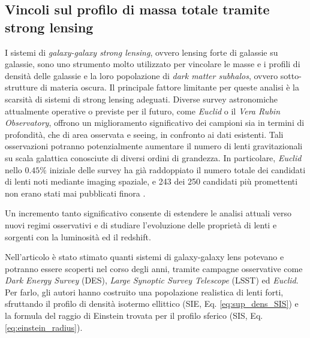 \subsection{Vincoli sul profilo di massa totale tramite strong lensing}
I sistemi di \emph{galaxy-galaxy strong lensing}, ovvero lensing forte di galassie su galassie, sono uno strumento molto utilizzato per vincolare le masse e i profili di densità delle galassie e la loro popolazione di \emph{dark matter subhalos}, ovvero sotto-strutture di materia oscura. Il principale fattore limitante per queste analisi è la scarsità di sistemi di strong lensing adeguati. Diverse survey astronomiche attualmente operative o previste per il futuro, come \emph{Euclid} o il \emph{Vera Rubin Observatory}, offrono un miglioramento significativo dei campioni sia in termini di profondità, che di area osservata e seeing, in confronto ai dati esistenti. Tali osservazioni potranno potenzialmente aumentare il numero di lenti gravitazionali su scala galattica conosciute di diversi ordini di grandezza. In particolare, \emph{Euclid} nello $0.45 \%$ iniziale delle survey ha già raddoppiato il numero totale dei candidati di lenti noti mediante imaging spaziale, e 243 dei 250 candidati più promettenti non erano stati mai pubblicati finora \parencite{Despali2026}. 

Un incremento tanto significativo consente di estendere le analisi attuali verso nuovi regimi osservativi e di studiare l'evoluzione delle proprietà di lenti e sorgenti con la luminosità ed il redshift.

Nell'articolo \textcite{Collett2015} è stato stimato quanti sistemi di galaxy-galaxy lens potevano e potranno essere scoperti nel corso degli anni, tramite  campagne osservative come \emph{Dark Energy Survey} (DES), \emph{Large Synoptic Survey Telescope} (LSST) ed \emph{Euclid}. Per farlo, gli autori hanno costruito una popolazione realistica di lenti forti, sfruttando il profilo di densità isotermo ellittico  (SIE, Eq. \ref{eq:sup_dens_SIS}) e la formula del raggio di Einstein trovata per il profilo sferico (SIS, Eq. \ref{eq:einstein_radius}). 

